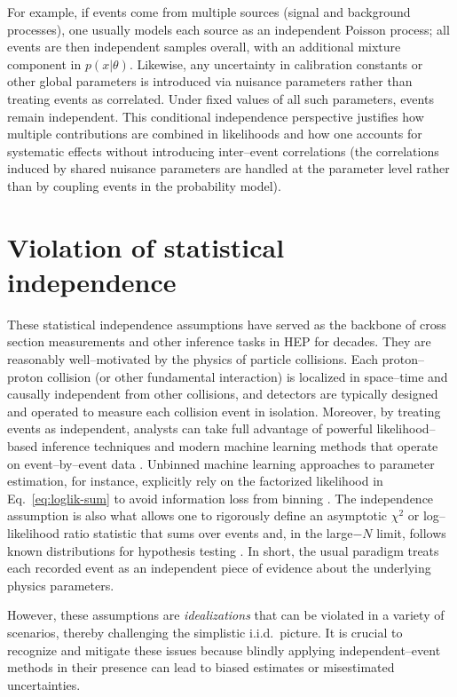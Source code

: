         For example, if events come from multiple sources (signal and background processes), one usually models each source as an independent Poisson process; all events are then independent samples overall, with an additional mixture component in $p(x|\theta)$.
        Likewise, any uncertainty in calibration constants or other global parameters is introduced via nuisance parameters rather than treating events as correlated.
        Under fixed values of all such parameters, events remain independent.
        This conditional independence perspective justifies how multiple contributions are combined in likelihoods and how one accounts for systematic effects without introducing inter--event correlations (the correlations induced by shared nuisance parameters are handled at the parameter level rather than by coupling events in the probability model).
\section{Violation of statistical independence}
    \label{sec:violation-of-statistical-independence}
    These statistical independence assumptions have served as the backbone of cross section measurements and other inference tasks in HEP for decades.
    They are reasonably well--motivated by the physics of particle collisions.
    Each proton--proton collision (or other fundamental interaction) is localized in space--time and causally independent from other collisions, and detectors are typically designed and operated to measure each collision event in isolation.
    Moreover, by treating events as independent, analysts can take full advantage of powerful likelihood--based inference techniques and modern machine learning methods that operate on event--by--event data .
    Unbinned machine learning approaches to parameter estimation, for instance, explicitly rely on the factorized likelihood in Eq.~\eqref{eq:loglik-sum} to avoid information loss from binning .
    The independence assumption is also what allows one to rigorously define an asymptotic $\chi^2$ or log--likelihood ratio statistic that sums over events and, in the large$-N$ limit, follows known distributions for hypothesis testing .
    In short, the usual paradigm treats each recorded event as an independent piece of evidence about the underlying physics parameters.

    However, these assumptions are \emph{idealizations} that can be violated in a variety of scenarios, thereby challenging the simplistic i.i.d.\ picture.
    It is crucial to recognize and mitigate these issues because blindly applying independent--event methods in their presence can lead to biased estimates or misestimated uncertainties.

